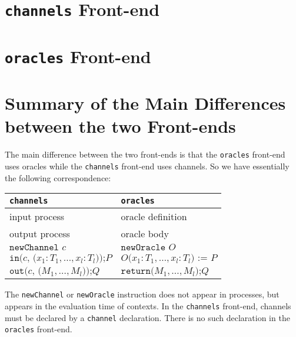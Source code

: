 \documentclass{article}
\begin{document}
\newif\ifchannels

\section{\texttt{channels} Front-end}\label{sec:channels}

\channelstrue


\section{\texttt{oracles} Front-end}\label{sec:oracles}

\channelsfalse


\section{Summary of the Main Differences between the two Front-ends}

The main difference between the two front-ends is that the \texttt{oracles}
front-end uses oracles while the \texttt{channels} front-end uses channels.
So we have essentially the following correspondence:
\begin{center}
\begin{tabular}{l|l}
\texttt{channels}&\texttt{oracles}\\
\hline
input process& oracle definition\\
output process& oracle body\\
$\texttt{newChannel }c$& $\texttt{newOracle }O$\\
$\texttt{in(}c\texttt{, (}x_1:T_1, \ldots, x_l:T_l\texttt{));}P$&$O\texttt{(}x_1:T_1, \ldots, x_l:T_l\texttt{) := }P$\\
$\texttt{out(}c\texttt{, (}M_1, \ldots, M_l\texttt{));}Q$&$\texttt{return(}M_1, \ldots, M_l\texttt{);}Q$\\
\end{tabular}
\end{center}
The \texttt{newChannel} or \texttt{newOracle} instruction does not appear
in processes, but appears in the evaluation time of contexts.
In the \texttt{channels} front-end, channels must be declared by a
\texttt{channel} declaration. There is no such declaration in the 
\texttt{oracles} front-end.
\end{document}
